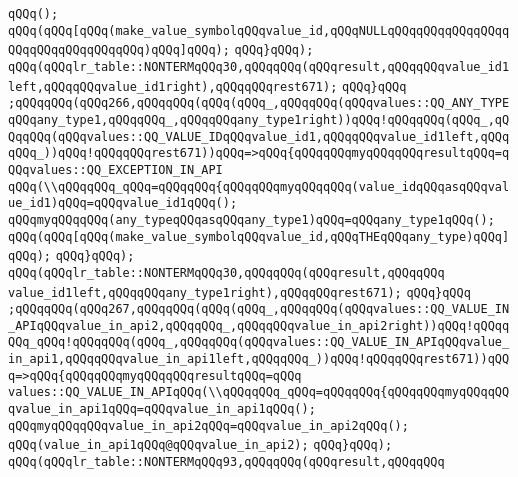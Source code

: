 \verb|qQQq();|\newline
\verb|qQQq(qQQq[qQQq(make_value_symbolqQQqvalue_id,qQQqNULLqQQqqQQqqQQqqQQqqQQqqQQqqQQqqQQqqQQq)qQQq]qQQq);|\newline
\verb|qQQq}qQQq);|\newline
\verb|qQQq(qQQqlr_table::NONTERMqQQq30,qQQqqQQq(qQQqresult,qQQqqQQqvalue_id1left,qQQqqQQqvalue_id1right),qQQqqQQqrest671);|\newline
\verb|qQQq}qQQq|\newline
\verb|;qQQqqQQq(qQQq266,qQQqqQQq(qQQq(qQQq_,qQQqqQQq(qQQqvalues::QQ_ANY_TYPEqQQqany_type1,qQQqqQQq_,qQQqqQQqany_type1right))qQQq!qQQqqQQq(qQQq_,qQQqqQQq(qQQqvalues::QQ_VALUE_IDqQQqvalue_id1,qQQqqQQqvalue_id1left,qQQqqQQq_))qQQq!qQQqqQQqrest671))qQQq=>qQQq{qQQqqQQqmyqQQqqQQqresultqQQq=qQQqvalues::QQ_EXCEPTION_IN_API|\newline
\verb|qQQq(\\qQQqqQQq_qQQq=qQQqqQQq{qQQqqQQqmyqQQqqQQq(value_idqQQqasqQQqvalue_id1)qQQq=qQQqvalue_id1qQQq();|\newline
\verb|qQQqmyqQQqqQQq(any_typeqQQqasqQQqany_type1)qQQq=qQQqany_type1qQQq();|\newline
\verb|qQQq(qQQq[qQQq(make_value_symbolqQQqvalue_id,qQQqTHEqQQqany_type)qQQq]qQQq);|\newline
\verb|qQQq}qQQq);|\newline
\verb|qQQq(qQQqlr_table::NONTERMqQQq30,qQQqqQQq(qQQqresult,qQQqqQQq|\newline
\verb|value_id1left,qQQqqQQqany_type1right),qQQqqQQqrest671);|\newline
\verb|qQQq}qQQq|\newline
\verb|;qQQqqQQq(qQQq267,qQQqqQQq(qQQq(qQQq_,qQQqqQQq(qQQqvalues::QQ_VALUE_IN_APIqQQqvalue_in_api2,qQQqqQQq_,qQQqqQQqvalue_in_api2right))qQQq!qQQqqQQq_qQQq!qQQqqQQq(qQQq_,qQQqqQQq(qQQqvalues::QQ_VALUE_IN_APIqQQqvalue_in_api1,qQQqqQQqvalue_in_api1left,qQQqqQQq_))qQQq!qQQqqQQqrest671))qQQq=>qQQq{qQQqqQQqmyqQQqqQQqresultqQQq=qQQq|\newline
\verb|values::QQ_VALUE_IN_APIqQQq(\\qQQqqQQq_qQQq=qQQqqQQq{qQQqqQQqmyqQQqqQQqvalue_in_api1qQQq=qQQqvalue_in_api1qQQq();|\newline
\verb|qQQqmyqQQqqQQqvalue_in_api2qQQq=qQQqvalue_in_api2qQQq();|\newline
\verb|qQQq(value_in_api1qQQq@qQQqvalue_in_api2);|\newline
\verb|qQQq}qQQq);|\newline
\verb|qQQq(qQQqlr_table::NONTERMqQQq93,qQQqqQQq(qQQqresult,qQQqqQQq|\newline
